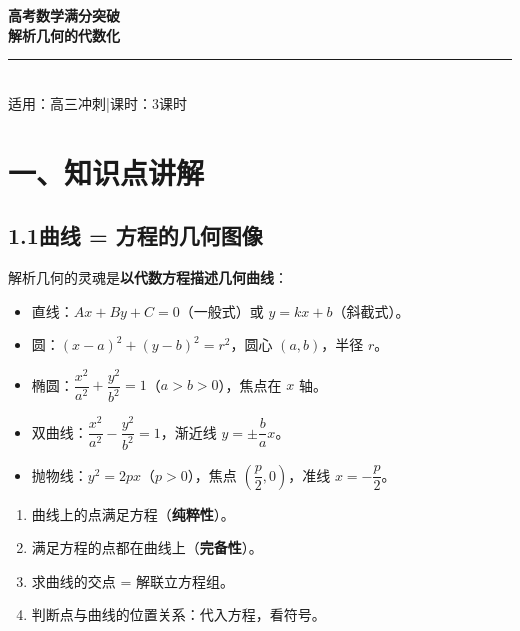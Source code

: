 \documentclass[12pt, a4paper]{ctexart}
\begin{document}
\begin{center}
{\Huge\bfseries\textcolor{mainblue}{高考数学满分突破}}\\[6pt]
{\LARGE\bfseries\textcolor{mainblue}{解析几何的代数化}}\\[12pt]
\rule{0.6\textwidth}{1pt}\\[8pt]
{\normalsize 适用：高三冲刺\quad |\quad 课时：3课时}
\end{center}
\vspace{10pt}

\section*{\textcolor{mainblue}{一、知识点讲解}}

\subsection*{1.1\quad 曲线 = 方程的几何图像}

\begin{knowledgebox}[核心原理]
解析几何的灵魂是\textbf{以代数方程描述几何曲线}：
\begin{itemize}[leftmargin=2em]
  \item 直线：$Ax+By+C=0$（一般式）或 $y=kx+b$（斜截式）。
  \item 圆：$(x-a)^2+(y-b)^2=r^2$，圆心 $(a,b)$，半径 $r$。
  \item 椭圆：$\dfrac{x^2}{a^2}+\dfrac{y^2}{b^2}=1$（$a>b>0$），焦点在 $x$ 轴。
  \item 双曲线：$\dfrac{x^2}{a^2}-\dfrac{y^2}{b^2}=1$，渐近线 $y=\pm\dfrac{b}{a}x$。
  \item 抛物线：$y^2=2px$（$p>0$），焦点 $\left(\dfrac{p}{2},0\right)$，准线 $x=-\dfrac{p}{2}$。
\end{itemize}
\end{knowledgebox}

\begin{knowledgebox}[方程与曲线的对应关系]
\begin{enumerate}[leftmargin=1.5em]
  \item 曲线上的点满足方程（\textbf{纯粹性}）。
  \item 满足方程的点都在曲线上（\textbf{完备性}）。
  \item 求曲线的交点 = 解联立方程组。
  \item 判断点与曲线的位置关系：代入方程，看符号。
\end{enumerate}
\end{knowledgebox}
\end{document}
